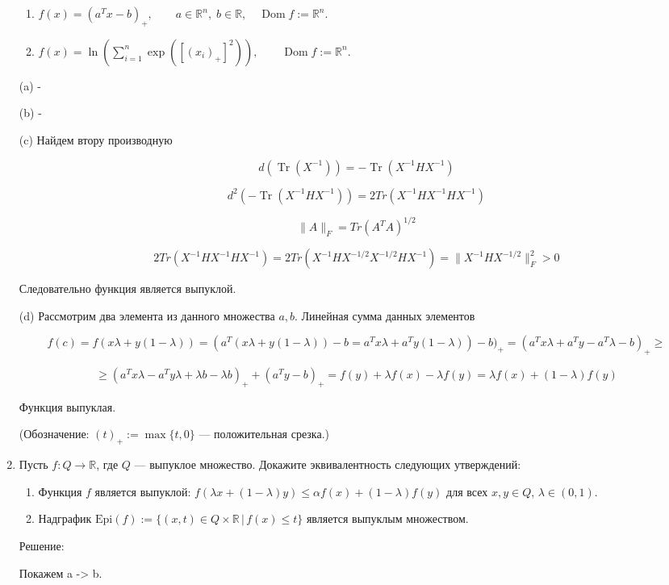 \documentclass{article}
\newcommand{\R}{\mathbb{R}}
\DeclareMathOperator*{\Tr}{Tr}
\DeclareMathOperator*{\Dom}{Dom}
\begin{document}
\begin{enumerate}[label=\textbf{\arabic*}, leftmargin=0em]
\begin{enumerate}
    \item $\displaystyle f(x) = (a^T x - b)_+, \qquad a \in \mathbb{R}^n, \; b \in \mathbb{R}, \quad \Dom f := \mathbb{R}^n$.

    \item $\displaystyle f(x) = \ln \left( \sum_{i = 1}^n \exp( [(x_i)_+]^2 ) \right), \qquad \Dom f := \mathbb{R}^n$.
\end{enumerate}

(a) -


(b) -


(c) Найдем втору производную

$$
d(\Tr( X^{-1} )) = - \Tr( X^{-1}HX^{-1})
$$

$$
d^2(- \Tr( X^{-1}HX^{-1})) = 2Tr(X^{-1}HX^{-1}HX^{-1})
$$

$$
\|A\|_{F} = Tr(A^TA)^{1/2}
$$

$$
2Tr(X^{-1}HX^{-1}HX^{-1}) = 2Tr(X^{-1}HX^{-1/2}X^{-1/2}HX^{-1}) = \|X^{-1}HX^{-1/2}\|_{F}^2 > 0
$$

Следовательно функция является выпуклой.


(d) Рассмотрим два элемента из данного множества $a,b$. Линейная сумма данных элементов

$$
f(c) = f(x\lambda + y(1 - \lambda)) = (a^T(x\lambda + y(1 - \lambda)) - b = a^Tx\lambda + a^Ty(1 - \lambda)) - b)_+ = (a^Tx\lambda + a^Ty - a^T\lambda - b)_+ \geq
$$

$$
\geq (a^Tx\lambda - a^Ty\lambda + \lambda b - \lambda b)_+ + (a^Ty - b)_+ = f(y) + \lambda f(x) - \lambda f(y) =  \lambda f(x) + (1-\lambda) f(y)
$$

Функция выпуклая.

(Обозначение: $(t)_+ := \max\{t, 0\}$ --- положительная срезка.)

\item Пусть $f: Q \rightarrow \R$, где $Q$ --- выпуклое множество. Докажите эквивалентность следующих утверждений:
\begin{enumerate}
\item Функция $f$ является выпуклой: $f(\lambda x + (1 - \lambda) y) \leqslant \alpha f(x) + (1 - \lambda) f(y)$ для всех $x, y \in Q$, $\lambda \in (0, 1)$.
\item Надграфик $\text{Epi}(f) := \{ (x, t) \in Q \times \mathbb{R} \, | \, f(x) \leqslant t \}$ является выпуклым множеством.
\end{enumerate}


Решение:


Покажем a -> b.


\end{enumerate}
\end{document}
